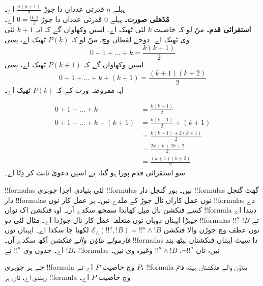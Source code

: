 \documentclass[../../include/open-logic-section]{subfiles}
\begin{document}
\begin{ex} پہلے $n$ قدرتی عدداں دا جوڑ $\frac{n(n+1)}{2}$ اے۔ \\

\textbf{مُڈھلی صورت۔} پہلے 0 قدرتی عدداں دا جوڑ $0=
\frac{0\cdot 1}{2}$ اے۔\\

\textbf{استقرائی قدم۔} منّ لو کہ خاصیت $k$ لئی ٹھیک اے۔ اسیں وکھاواں گے کہ ایہ $k+1$ لئی وی ٹھیک اے۔ دوجے لفظاں وچ، منّ لو کہ $P(k)$ ٹھیک اے، یعنی
\[ 0 + 1 + \ldots + k = \frac{k(k+1)}{2} \]
اسیں وکھاواں گے کہ $P(k+1)$ ٹھیک اے، یعنی
\[ 0 + 1 + \ldots + k + (k+1) = \frac{(k+1)(k+2)}{2} \]
ایہ مفروضہ ورت کے کہ $P(k)$ ٹھیک اے۔

\begin{align*}
0 + 1 + \ldots + k &= \frac{k(k+1)}{2} \tag{مفروضہ} \\
0 + 1 + \ldots + k + (k+1) &= \frac{k(k+1)}{2} + (k+1)
\tag{$k+1$ دوناں پاسیاں وچ پاؤ} \\
&= \frac{k(k+1) + 2(k+1)}{2} \\
&= \frac{2k + k + 2k +2}{2} \\
&=\frac{(k+1)(k+2)}{2}
\end{align*}
سو استقرائی قدم پورا ہو گیا، تے اسیں دعویٰ ثابت کر دِتّا اے۔
\end{ex}

\begin{explain}
!!{formula}s لئی بنیادی اجزا جوہری !!{formula}s نیں۔ ہور گنجل دار !!{formula}s گھٹ گنجل دار !!{formula}s نوں عمل کاراں نال جوڑ کے ملدے نیں۔ ہر عمل کار نوں !!{formula}s دے کسے فنکشن نال میل کھاندا سمجھ سکدے آں۔ اوہ فنکشن اک نواں !!{formula} دیندا اے جیہڑا ایہناں دوہاں نوں متعلقہ عمل کار نال جوڑدا اے۔ مثال لئی دو !!{formula}s $!!^a$ تے $!B$ نوں عطف وچ جوڑن والا فنکشن $ \mathcal E _\land (!!^a,
!B) = !!^a \land !B$ لکھیا جا سکدا اے۔ ایہناں نوں \emph{فارمولے بناؤن والے فنکشن} آکھ سکدے آں۔ !!{formula}s دا سیٹ ایہناں فنکشناں ہیٹھ بند اے۔ جدوں وی $!!^a$ تے $!B$، !!{formula}s نیں، تاں $\lnot !!^a$، $!!^a \land
!B$ وغیرہ وی نیں۔
\end{explain}

\begin{defn}
جے ہر جوہری !!{formula} وچ خاصیت $P$ اے تے $P$، !!{formula} بناؤن والے فنکشناں ہیٹھ قائم رہندی اے، تاں ہر !!{formula} وچ خاصیت $P$ اے۔
\end{defn}
\end{document}
